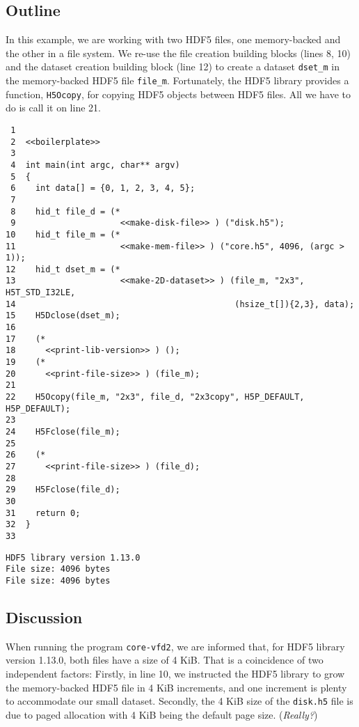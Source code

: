 \documentclass[a4paper, 12pt]{article}
\begin{document}
\subsection{Outline}
\label{sec:org6e03278}

In this example, we are working with two HDF5 files, one memory-backed and
the other in a file system. We re-use the file creation building blocks
(lines 8, 10) and the dataset creation building block
(line 12) to create a dataset \texttt{dset\_m} in the memory-backed HDF5
file \texttt{file\_m}. Fortunately, the HDF5 library provides a function, \texttt{H5Ocopy},
for copying HDF5 objects between HDF5 files. All we have to do is call it on
line 21.

\begin{verbatim}
 1
 2  <<boilerplate>>
 3
 4  int main(int argc, char** argv)
 5  {
 6    int data[] = {0, 1, 2, 3, 4, 5};
 7
 8    hid_t file_d = (*
 9                     <<make-disk-file>> ) ("disk.h5");
10    hid_t file_m = (*
11                     <<make-mem-file>> ) ("core.h5", 4096, (argc > 1));
12    hid_t dset_m = (*
13                     <<make-2D-dataset>> ) (file_m, "2x3", H5T_STD_I32LE,
14                                            (hsize_t[]){2,3}, data);
15    H5Dclose(dset_m);
16
17    (*
18      <<print-lib-version>> ) ();
19    (*
20      <<print-file-size>> ) (file_m);
21
22    H5Ocopy(file_m, "2x3", file_d, "2x3copy", H5P_DEFAULT, H5P_DEFAULT);
23
24    H5Fclose(file_m);
25
26    (*
27      <<print-file-size>> ) (file_d);
28
29    H5Fclose(file_d);
30
31    return 0;
32  }
33
\end{verbatim}

\begin{verbatim}
HDF5 library version 1.13.0
File size: 4096 bytes
File size: 4096 bytes
\end{verbatim}

\subsection{Discussion}
\label{sec:org8875a7c}

When running the program \texttt{core-vfd2}, we are informed that, for HDF5 library
version 1.13.0, both files have a size of 4 KiB. That is a coincidence of
two independent factors: Firstly, in line 10, we instructed the
HDF5 library to grow the memory-backed HDF5 file in 4 KiB increments, and
one increment is plenty to accommodate our small dataset. Secondly, the 4
KiB size of the \texttt{disk.h5} file is due to paged allocation with 4 KiB being
the default page size. (\emph{Really?})
\end{document}
